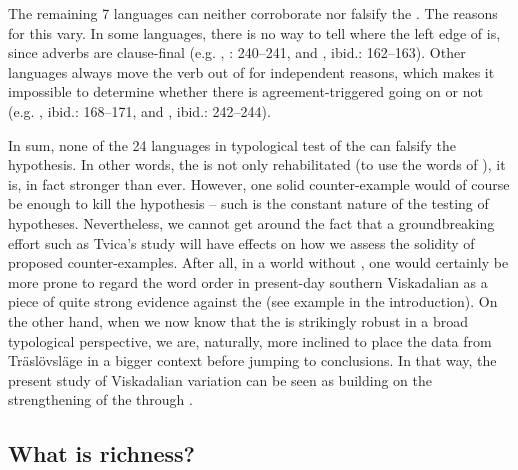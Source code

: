 \documentclass[output=paper,colorlinks,citecolor=brown,draft,draftmode]{langscibook}
\begin{document}
The remaining 7 languages can neither corroborate nor falsify the . The reasons for this vary. In some languages, there is no way to tell where the left edge of  is, since adverbs are clause-final (e.g. , \citealt{Tvica2017}: 240–241, and , ibid.: 162–163). Other languages always move the verb out of  for independent reasons, which makes it impossible to determine whether there is agreement-triggered  going on or not (e.g. , ibid.: 168–171, and , ibid.: 242–244).



In sum, none of the 24 languages in  typological test of the  can falsify the hypothesis. In other words, the  is not only rehabilitated (to use the words of \citealt{KoenemanZeijlstra2014}), it is, in fact stronger than ever. However, one solid counter-example would of course be enough to kill the hypothesis – such is the constant nature of the testing of hypotheses. Nevertheless, we cannot get around the fact that a groundbreaking effort such as Tvica’s study will have effects on how we assess the solidity of proposed counter-examples. After all, in a world without \citet{Tvica2017}, one would certainly be more prone to regard the  word order in present-day southern Viskadalian as a piece of quite strong evidence against the  (see example  in the introduction). On the other hand, when we now know that the  is strikingly robust in a broad typological perspective, we are, naturally, more inclined to place the data from Träslövsläge in a bigger context before jumping to conclusions. In that way, the present study of Viskadalian variation can be seen as building on the strengthening of the  through \citet{Tvica2017}.


\subsection{What is richness?}\label{sec:petzell:4.2}
\end{document}
